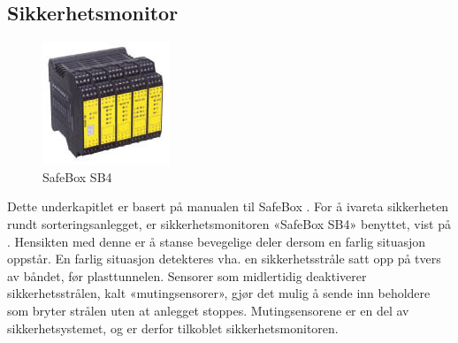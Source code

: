 \documentclass[Visionprosjekt.tex]{subfiles}
\begin{document}
%
%
%


\clearpage
\subsection{Sikkerhetsmonitor}



\begin{figure}
	\centering
    \vspace{-10pt}
		\includegraphics{bilder/sb4.jpg}
	\caption{SafeBox SB4}
	\label{fig:sb4}
\end{figure}


Dette underkapitlet er basert på manualen til SafeBox \cite{sb4}. For å ivareta sikkerheten rundt sorteringsanlegget, er sikker\-hets\-monitoren «SafeBox SB4» benyttet, vist på  \cite{sb4bilde}. Hensikten med denne er å stanse bevegelige deler dersom en   farlig situasjon oppstår. %
En farlig situasjon detekteres vha. en sikkerhetsstråle satt opp på tvers av båndet, før plasttunnelen. Sensorer som midlertidig deaktiverer sikkerhetsstrålen, kalt «mutingsensorer», gjør det mulig å sende inn beholdere som bryter strålen uten at anlegget stoppes. Mutingsensorene er en del av sikkerhetsystemet, og er derfor tilkoblet sikkerhetsmonitoren. 

\end{document}
